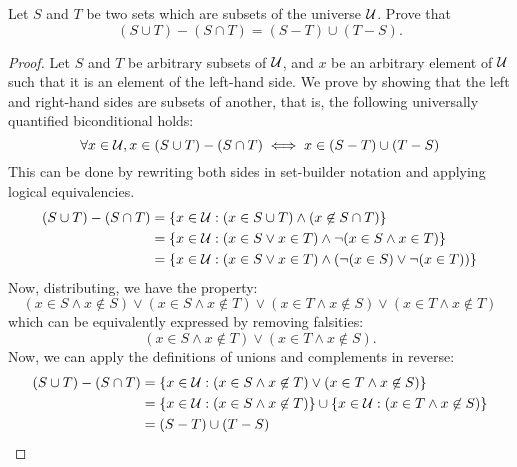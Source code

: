 \begin{recommended}\label{distribute}
  Let $S$ and $T$ be two sets which are subsets of the universe $\mathcal{U}$.
  Prove that \[ (S \cup T) - (S \cap T) = (S - T) \cup (T - S). \]
\end{recommended}
\begin{proof}
  Let $S$ and $T$ be arbitrary subsets of $\mathcal{U}$, and $x$ be an arbitrary element of $\mathcal{U}$ such that it is an element of the left-hand side.
  We prove by showing that the left and right-hand sides are subsets of another,
  that is, the following universally quantified biconditional holds:
  \begin{equation*}
    \forall x \in \mathcal{U}, x \in (S \cup T)-(S \cap T) \iff x \in (S-T) \cup (T-S)
  \end{equation*}
  This can be done by rewriting both sides in set-builder notation and applying logical equivalencies.
  \begin{align*}
    (S \cup T)-(S \cap T)
     & = \{x\in\mathcal{U} : (x \in S \cup T) \land (x \not\in S \cap T)\}                       \\
     & = \{x\in\mathcal{U} : (x \in S \lor x \in T) \land \lnot (x \in S \land x \in T)\}        \\
     & = \{x\in\mathcal{U} : (x \in S \lor x \in T) \land (\lnot(x \in S) \lor \lnot(x \in T))\}
  \end{align*}
  Now, distributing, we have the property:
  \begin{equation*}
    (x \in S \land x \not\in S) \lor
    (x \in S \land x \not\in T) \lor
    (x \in T \land x \not\in S) \lor
    (x \in T \land x \not\in T)
  \end{equation*}
  which can be equivalently expressed by removing falsities:
  \begin{equation*}
    (x \in S \land x \not\in T) \lor (x \in T \land x \not\in S).
  \end{equation*}
  Now, we can apply the definitions of unions and complements in reverse:
  \begin{align*}
    (S \cup T)-(S \cap T)
     & = \{x\in\mathcal{U}:(x \in S \land x \not\in T) \lor (x \in T \land x \not\in S)\}             \\
     & = \{x\in\mathcal{U}:(x \in S \land x \not\in T)\} \cup \{x\in\mathcal{U}: (x \in T \land x \not\in S)\} \\
     & = (S-T) \cup (T-S) \qedhere
  \end{align*}
\end{proof}


